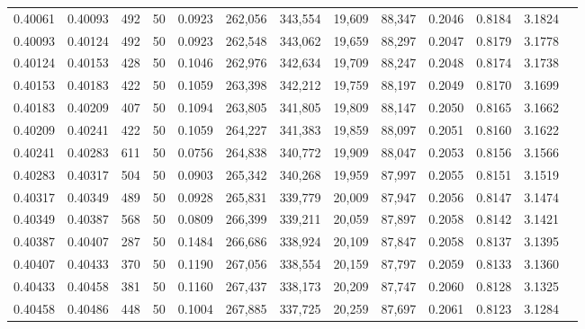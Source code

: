 \begin{tabular}{rrrrrrrrrrrrr}
0.40061 & 0.40093 &   492 &  50 &                                     0.0923 & 262,056 & 343,554 &  19,609 &  88,347 & 0.2046 & 0.8184 & 3.1824 \\
0.40093 & 0.40124 &   492 &  50 &                                     0.0923 & 262,548 & 343,062 &  19,659 &  88,297 & 0.2047 & 0.8179 & 3.1778 \\
0.40124 & 0.40153 &   428 &  50 &                                     0.1046 & 262,976 & 342,634 &  19,709 &  88,247 & 0.2048 & 0.8174 & 3.1738 \\
0.40153 & 0.40183 &   422 &  50 &                                     0.1059 & 263,398 & 342,212 &  19,759 &  88,197 & 0.2049 & 0.8170 & 3.1699 \\
0.40183 & 0.40209 &   407 &  50 &                                     0.1094 & 263,805 & 341,805 &  19,809 &  88,147 & 0.2050 & 0.8165 & 3.1662 \\
0.40209 & 0.40241 &   422 &  50 &                                     0.1059 & 264,227 & 341,383 &  19,859 &  88,097 & 0.2051 & 0.8160 & 3.1622 \\
0.40241 & 0.40283 &   611 &  50 &                                     0.0756 & 264,838 & 340,772 &  19,909 &  88,047 & 0.2053 & 0.8156 & 3.1566 \\
0.40283 & 0.40317 &   504 &  50 &                                     0.0903 & 265,342 & 340,268 &  19,959 &  87,997 & 0.2055 & 0.8151 & 3.1519 \\
0.40317 & 0.40349 &   489 &  50 &                                     0.0928 & 265,831 & 339,779 &  20,009 &  87,947 & 0.2056 & 0.8147 & 3.1474 \\
0.40349 & 0.40387 &   568 &  50 &                                     0.0809 & 266,399 & 339,211 &  20,059 &  87,897 & 0.2058 & 0.8142 & 3.1421 \\
0.40387 & 0.40407 &   287 &  50 &                                     0.1484 & 266,686 & 338,924 &  20,109 &  87,847 & 0.2058 & 0.8137 & 3.1395 \\
0.40407 & 0.40433 &   370 &  50 &                                     0.1190 & 267,056 & 338,554 &  20,159 &  87,797 & 0.2059 & 0.8133 & 3.1360 \\
0.40433 & 0.40458 &   381 &  50 &                                     0.1160 & 267,437 & 338,173 &  20,209 &  87,747 & 0.2060 & 0.8128 & 3.1325 \\
0.40458 & 0.40486 &   448 &  50 &                                     0.1004 & 267,885 & 337,725 &  20,259 &  87,697 & 0.2061 & 0.8123 & 3.1284 \\

\end{tabular}

